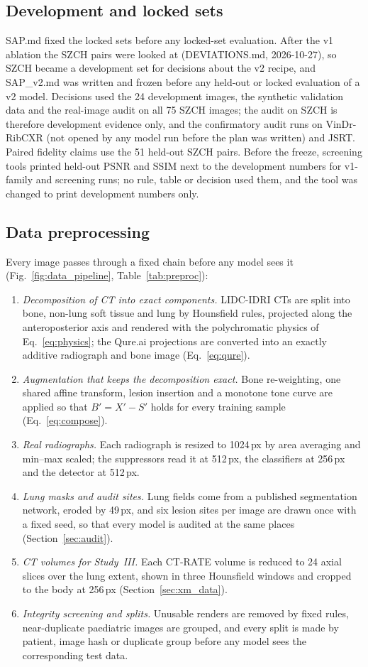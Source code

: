 \subsection{Development and locked sets}
SAP.md fixed the locked sets before any locked-set evaluation. After the v1 ablation the SZCH pairs were looked at (DEVIATIONS.md, 2026-10-27), so SZCH
became a development set for decisions about the v2 recipe, and SAP\_v2.md was written and frozen before any held-out or locked evaluation of a v2
model. Decisions used the 24 development images, the synthetic validation data and the real-image audit on all 75 SZCH images; the audit on SZCH is
therefore development evidence only, and the confirmatory audit runs on VinDr-RibCXR (not opened by any model run before the plan was written) and
JSRT. Paired fidelity claims use the 51 held-out SZCH pairs. Before the freeze, screening tools printed held-out PSNR and SSIM next to the
development numbers for v1-family and screening runs; no rule, table or decision used them, and the tool was changed to print development
numbers only.

\subsection{Data preprocessing}
\label{sec:preproc}
Every image passes through a fixed chain before any model sees it (Fig.~\ref{fig:data_pipeline}, Table~\ref{tab:preproc}):
\begin{enumerate}
\item \emph{Decomposition of CT into exact components.} LIDC-IDRI CTs are split into bone, non-lung soft tissue and lung by Hounsfield
 rules, projected along the anteroposterior axis and rendered with the polychromatic physics of Eq.~\eqref{eq:physics}; the Qure.ai
 projections are converted into an exactly additive radiograph and bone image (Eq.~\eqref{eq:qure}).
\item \emph{Augmentation that keeps the decomposition exact.} Bone re-weighting, one shared affine transform, lesion insertion and a
 monotone tone curve are applied so that $B'=X'-S'$ holds for every training sample (Eq.~\eqref{eq:compose}).
\item \emph{Real radiographs.} Each radiograph is resized to 1024\,px by area averaging and min--max scaled; the suppressors read it at
 512\,px, the classifiers at 256\,px and the detector at 512\,px.
\item \emph{Lung masks and audit sites.} Lung fields come from a published segmentation network, eroded by 49\,px, and six lesion sites per
 image are drawn once with a fixed seed, so that every model is audited at the same places (Section~\ref{sec:audit}).
\item \emph{CT volumes for Study~III.} Each CT-RATE volume is reduced to 24 axial slices over the lung extent, shown in three Hounsfield
 windows and cropped to the body at 256\,px (Section~\ref{sec:xm_data}).
\item \emph{Integrity screening and splits.} Unusable renders are removed by fixed rules, near-duplicate paediatric images are grouped, and
 every split is made by patient, image hash or duplicate group before any model sees the corresponding test data.
\end{enumerate}

